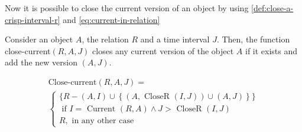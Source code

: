 Now it is possible to close the current version of an object by using \eqref{def:close-a-crisp-interval-r} and \eqref{eq:current-in-relation}

\begin{definition}
\label{def:close-current-version}
Consider an object $A$, the relation $R$ and a time interval $J$. Then, the function close-current$\left(R,A,J \right)$ closes any current version of the object $A$ if it exists and add the new version $\left(A, J \right)$.

\begin{eqnarray}
\label{eq:close-current}
\text{Close-current} \left(R, A, J \right) =\\
\begin{cases}
\nonumber
\big \lbrace R - \left(A, I \right) \cup \left \lbrace \left(A, \mbox{ CloseR } \left(I, J\right) \right) \cup \left(A, J\right)\right \rbrace  \big \rbrace \\
\nonumber
\mbox{ if } I = \mbox{ Current } \left(R, A \right) \wedge J > \mbox{ CloseR } \left(I, J \right)   \\
\nonumber R , \text{ in any other case}
\end{cases}
\end{eqnarray}
\end{definition}

%

